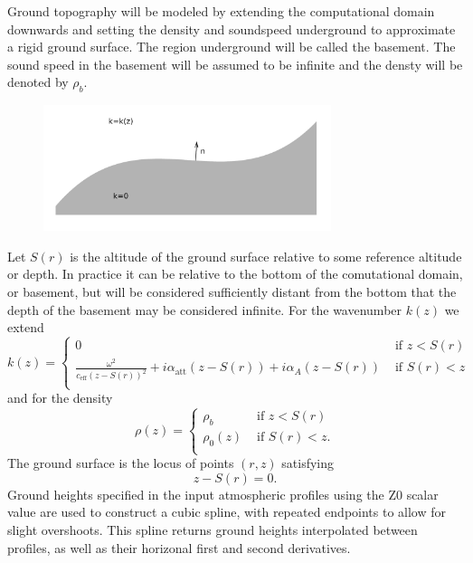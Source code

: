 Ground topography will be modeled by extending the computational domain downwards and setting the density and soundspeed underground to approximate a rigid ground surface. The region underground will be called the basement. The sound speed in the basement will be assumed to be infinite and the densty will be denoted by $\rho_b$. 
\begin{figure}[h]
  \centering
  \includegraphics[width=0.75\textwidth]{figs/topography.pdf}
\end{figure}
Let $S(r)$ is the altitude of the ground surface relative to some reference altitude or depth. In practice it can be relative to the bottom of the comutational domain, or basement, but will be considered sufficiently distant from the bottom that the depth of the basement may be considered infinite. For the wavenumber $k(z)$ we extend 
\begin{equation}
k(z)=\begin{cases}
0 & \text{   if } z<S(r)\\
\frac{\omega^2}{c_{\text{eff}}(z-S(r))^2}+i\alpha_{\text{att}}(z-S(r))+i\alpha_A(z-S(r)) & \text{   if } S(r)<z\\
\end{cases}
\label{eq:k_def_w_basement}\end{equation}
and for the density
\[
\rho(z) =\begin{cases}
\rho_b & \text{   if } z<S(r)\\
\rho_0(z) & \text{   if } S(r)<z.\\
\end{cases}
\]
The ground surface is the locus of points $(r,z)$ satisfying 
\[
z-S(r)=0.
\]
Ground heights specified in the input atmospheric profiles using the Z0 scalar value are used to construct a cubic spline, with repeated endpoints to allow for slight overshoots. This spline returns ground heights interpolated between profiles, as well as their horizonal first and second derivatives.



